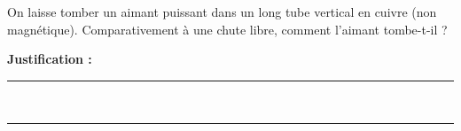 On laisse tomber un aimant puissant dans un long tube vertical en cuivre (non magnétique). Comparativement à une chute libre, comment l'aimant tombe-t-il ?

\choices

\noindent\textbf{Justification :} \hrulefill \\[2.5ex]
\rule{\linewidth}{0.4pt} \\[2.5ex]
\rule{\linewidth}{0.4pt}
\vfill
